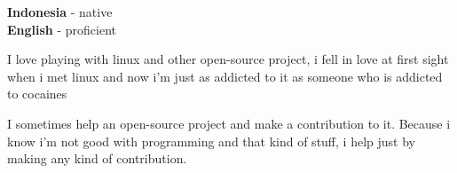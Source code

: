 \documentclass[9pt]{developercv} %
\begin{document}
\begin{minipage}[t]{0.3\textwidth}
	\vspace{-\baselineskip} %

	
	\textbf{Indonesia} - native\\
	\textbf{English} - proficient
\end{minipage}
\hfill
\begin{minipage}[t]{0.3\textwidth}
	\vspace{-\baselineskip} %
	
	
	I love playing with linux and other open-source project, i fell in love at
  first sight when i met linux and now i'm just as addicted to it as someone who
  is addicted to cocaines
\end{minipage}
\hfill
\begin{minipage}[t]{0.3\textwidth}
	\vspace{-\baselineskip} %
	
	
	I sometimes help an open-source project and make a contribution to it. Because
  i know i'm not good with programming and that kind of stuff, i help just by
  making any kind of contribution.
\end{minipage}

\end{document}
